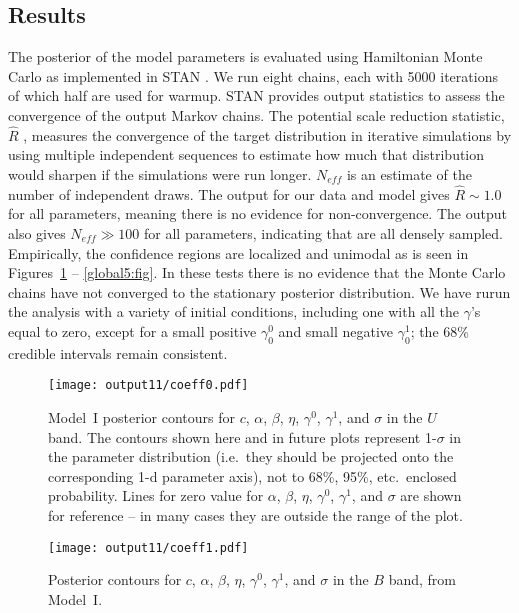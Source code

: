 \documentclass{aastex61}   	%
\begin{document}
\subsection{Results}
\label{results:sec}
The posterior of the model parameters is evaluated using Hamiltonian Monte Carlo as implemented in
STAN \citep{stan}.  We run eight chains, each with 5000 iterations of which
half are used for warmup.
STAN provides output statistics to assess
the convergence of the output Markov chains.
The 
potential scale reduction statistic, $\hat{R}$ \citep{Gelman92}, measures the convergence of the target distribution
in iterative simulations 
by using multiple independent sequences to estimate how much that distribution would sharpen if the simulations were run longer.
$N_{eff}$ is an estimate of the number of independent draws. The output for our data and model gives $\hat{R} \sim 1.0$ for all parameters, meaning there is no evidence for non-convergence.  The
output also gives  $N_{eff} \gg 100$ for all parameters, indicating that are all densely sampled.
Empirically, the confidence regions are localized and unimodal as is seen in  Figures~\ref{global1:fig} -- \ref{global5:fig}.  In these tests there is no evidence that
the Monte Carlo chains have not converged to the stationary posterior distribution.
We have rurun the analysis with a variety of initial conditions, including one with all the $\gamma$'s equal to zero, except for a small positive 
$\gamma^0_0$ and small negative $\gamma^1_0$; the 68\% credible intervals
remain consistent.

\begin{figure}[htbp] %
   \centering
   \texttt{[image: output11/coeff0.pdf]} 
            \caption{Model~I posterior contours for $c$, $\alpha$, $\beta$, $\eta$, $\gamma^0$, $\gamma^1$, and $\sigma$ in the $U$ band.
            The contours shown here and in future plots represent 1-$\sigma$ in the parameter distribution (i.e.\ they should be
            projected onto the corresponding 1-d parameter axis), not to 68\%, 95\%, etc.\
            enclosed probability.  Lines for zero value for $\alpha$, $\beta$, $\eta$, $\gamma^0$, $\gamma^1$, and $\sigma$ are shown for reference --
            in many cases they are outside the range of the plot.
            \label{global1:fig}}
\end{figure}

\begin{figure}[htbp] %
   \centering
   \texttt{[image: output11/coeff1.pdf]} 
            \caption{Posterior contours for $c$, $\alpha$, $\beta$, $\eta$, $\gamma^0$, $\gamma^1$, and $\sigma$ in the $B$ band, from Model~I.
 \label{global2:fig}}
\end{figure}
\end{document}
